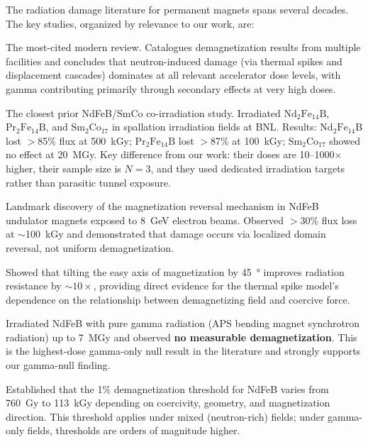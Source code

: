 \documentclass[11pt,letterpaper]{article}
\begin{document}
The radiation damage literature for permanent magnets spans several decades.
The key studies, organized by relevance to our work, are:

\begin{description}[style=nextline]
    \item[Shen et al.\ \cite{Shen2018}]
    The most-cited modern review. Catalogues demagnetization results from
    multiple facilities and concludes that neutron-induced damage (via thermal
    spikes and displacement cascades) dominates at all relevant accelerator
    dose levels, with gamma contributing primarily through secondary effects at
    very high doses.

    \item[Simos et al.\ \cite{Simos2018}]
    The closest prior NdFeB/SmCo co-irradiation study. Irradiated
    $\mathrm{Nd_2Fe_{14}B}$, $\mathrm{Pr_2Fe_{14}B}$, and
    $\mathrm{Sm_2Co_{17}}$ in spallation irradiation fields at BNL. Results:
    $\mathrm{Nd_2Fe_{14}B}$ lost $>$85\% flux at \SI{500}{kGy};
    $\mathrm{Pr_2Fe_{14}B}$ lost $>$87\% at \SI{100}{kGy}; $\mathrm{Sm_2Co_{17}}$
    showed no effect at \SI{20}{MGy}. Key difference from our work: their
    doses are 10--1000$\times$ higher, their sample size is $N = 3$, and they
    used dedicated irradiation targets rather than parasitic tunnel exposure.

    \item[Bizen et al.\ (2016) \cite{Bizen2016}]
    Landmark discovery of the magnetization reversal mechanism in NdFeB
    undulator magnets exposed to \SI{8}{GeV} electron beams. Observed $>$30\%
    flux loss at $\sim$\SI{100}{kGy} and demonstrated that damage occurs via
    localized domain reversal, not uniform demagnetization.

    \item[Bizen et al.\ (2018) \cite{Bizen2018}]
    Showed that tilting the easy axis of magnetization by \SI{45}{\degree}
    improves radiation resistance by $\sim$$10\times$, providing direct
    evidence for the thermal spike model's dependence on the relationship
    between demagnetizing field and coercive force.

    \item[Alderman et al.\ \cite{Alderman}]
    Irradiated NdFeB with pure gamma radiation (APS bending magnet
    synchrotron radiation) up to \SI{7}{MGy} and observed \textbf{no
    measurable demagnetization}. This is the highest-dose gamma-only null
    result in the literature and strongly supports our gamma-null finding.

    \item[APS LS-290 \cite{APSLS290}]
    Established that the 1\% demagnetization threshold for NdFeB varies from
    \SI{760}{Gy} to \SI{113}{kGy} depending on coercivity, geometry, and
    magnetization direction. This threshold applies under mixed (neutron-rich)
    fields; under gamma-only fields, thresholds are orders of magnitude higher.
\end{description}
\end{document}
